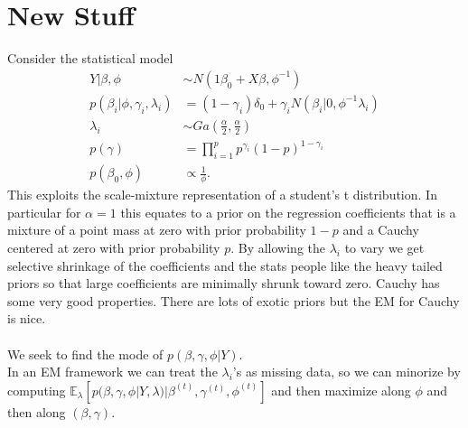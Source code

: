\documentclass[6pt]{article}
\begin{document}
\section{New Stuff}
Consider the statistical model
\begin{align*}
	Y|\beta,\phi &\sim N(1\beta_{0}+X\beta,\phi^{-1})\\
	p(\beta_{i}|\phi, \gamma_{i},\lambda_{i})&=(1-\gamma_{i})\delta_{0}+\gamma_{i} N\left(\beta_{i}| 0,\phi^{-1}\lambda_{i}\right)\\
	\lambda_{i}&\sim Ga\left( \frac{\alpha}{2},\frac{\alpha}{2} \right)\\
	p(\gamma)&=\prod_{i=1}^{p}p^{\gamma_{i}}(1-p)^{1-\gamma_{i}}\\
	p(\beta_{0},\phi)&\propto \frac{1}{\phi}.
\end{align*}
This exploits the scale-mixture representation of a student's t distribution. In particular for $\alpha=1$ this equates to a prior on the regression coefficients that is a mixture of a point mass at zero with prior probability $1-p$ and a Cauchy centered at zero with prior probability $p$. By allowing the $\lambda_{i}$ to vary we get selective shrinkage of the coefficients and the stats people like the heavy tailed priors so that large coefficients are minimally shrunk toward zero. Cauchy has some very good properties. There are lots of exotic priors but the EM for Cauchy is nice.\\
\\
We seek to find the mode of $p(\beta,\gamma,\phi|Y)$. \\
In an EM framework we can treat the $\lambda_{i}$'s as missing data, so we can minorize by computing $\mathbb{E}_{\lambda}[p(\beta,\gamma,\phi|Y,\lambda)|\beta^{(t)},\gamma^{(t)},\phi^{(t)}]$ and then maximize along $\phi$ and then along $(\beta,\gamma)$.
\end{document}
